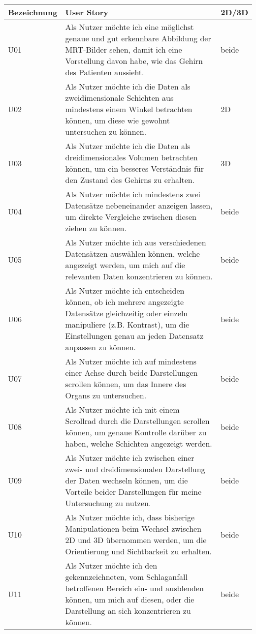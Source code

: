 \begin{longtable}{p{}p{}p{}}

Bezeichnung & User Story & 2D/3D \\
\toprule
U01 & Als Nutzer möchte ich eine möglichst genaue und gut erkennbare Abbildung der MRT-Bilder sehen, damit ich eine Vorstellung davon habe, wie das Gehirn des Patienten aussieht. & beide\\
\midrule 
U02 & Als Nutzer möchte ich die Daten als zweidimensionale Schichten aus mindestens einem Winkel betrachten können, um diese wie gewohnt untersuchen zu können.  & 2D\\
\midrule 
U03 & Als Nutzer möchte ich die Daten als dreidimensionales Volumen betrachten können, um ein besseres Verständnis für den Zustand des Gehirns zu erhalten. & 3D\\
\midrule 
U04 & Als Nutzer möchte ich mindestens zwei Datensätze nebeneinander anzeigen lassen, um direkte Vergleiche zwischen diesen ziehen zu können. & beide\\
\midrule 
U05 & Als Nutzer möchte ich aus verschiedenen Datensätzen auswählen können, welche angezeigt werden, um mich auf die relevanten Daten konzentrieren zu können. & beide\\
\midrule
U06 & Als Nutzer möchte ich entscheiden können, ob ich mehrere angezeigte Datensätze gleichzeitig oder einzeln manipuliere (z.B. Kontrast), um die Einstellungen genau an jeden Datensatz anpassen zu können. & beide\\
\midrule 
U07 & Als Nutzer möchte ich auf mindestens einer Achse durch beide Darstellungen scrollen können, um das Innere des Organs zu untersuchen. & beide \\
\midrule 
U08 & Als Nutzer möchte ich mit einem Scrollrad durch die Darstellungen scrollen können, um genaue Kontrolle darüber zu haben, welche Schichten angezeigt werden. & beide\\
\midrule 
U09 & Als Nutzer möchte ich zwischen einer zwei- und dreidimensionalen Darstellung der Daten wechseln können, um die Vorteile beider Darstellungen für meine Untersuchung zu nutzen. & beide\\
\midrule 
U10 & Als Nutzer möchte ich, dass bisherige Manipulationen beim Wechsel zwischen 2D und 3D übernommen werden, um die Orientierung und Sichtbarkeit zu erhalten. & beide\\
\midrule 
U11  & Als Nutzer möchte ich den gekennzeichneten, vom Schlaganfall betroffenen Bereich ein- und ausblenden können, um mich auf diesen, oder die Darstellung an sich konzentrieren zu können. & beide\\

\end{longtable}
